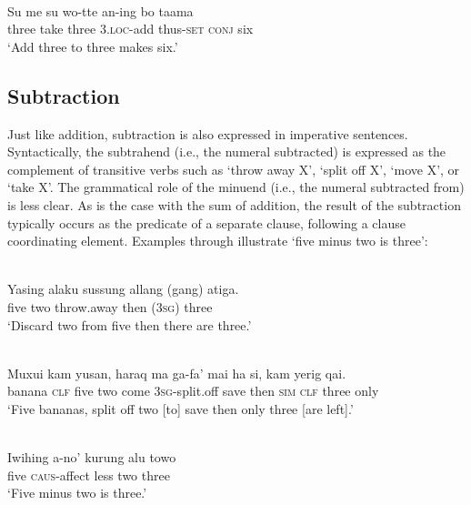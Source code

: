 \documentclass[output=paper]{LSP/langsci}
\begin{document}
\ea%
\label{bkm:Ref342663723}
\\
\gll   Su  me  su  wo-tte  an-ing  bo  taama\\  
   three   take  three  3.\textsc{loc}{}-add  thus-\textsc{set}   \textsc{conj}  six  \\
\glt `Add three to three makes six.'  
\z



 

  

\subsection{Subtraction}
\label{sec:8:Subtraction}
Just like addition, subtraction is also expressed in imperative sentences. Syntactically, the subtrahend (i.e., the numeral subtracted) is expressed as the complement of transitive verbs such as `throw away X', `split off X', `move X', or `take X'. The grammatical role of the minuend (i.e., the numeral subtracted from) is less clear. As is the case with the sum of addition, the result of the subtraction typically occurs as the predicate of a separate clause, following a clause coordinating element. Examples  through  illustrate `five minus two is three':


\ea%
\label{bkm:Ref358042906}
\\
\gll  Yasing  alaku  sussung  allang  (gang)  atiga.  \\  
   five  two  throw.away  then  (\textsc{3sg) } three  \\
\glt `Discard two from five then there are three.'
\z

 

\ea
\label{ex:8:1240}
\\
 \gll Muxui  kam  yusan,     haraq  ma  ga-fa'   mai   ha  si,  kam  yerig   qai.      \\
    banana  \textsc{clf}  five   two  come  \textsc{3sg-}split.off  save  then  \textsc{sim}  \textsc{clf} three  only    \\
 \glt `Five bananas,    split off two [to] save then only three [are left].' 
\z
 
\ea
\label{ex:8:1241}
\\ 
\gll Iwihing  a-no'   kurung  alu  towo\\
 five  \textsc{caus}{}-affect  less  two  three\\
\glt `Five minus two is three.' 
\z  
\end{document}
